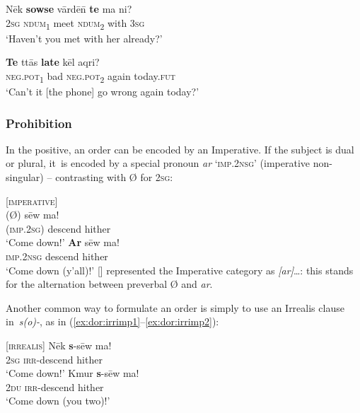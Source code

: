 \documentclass[output=paper,colorlinks,citecolor=brown,draft]{langscibook}
\begin{document}
\ea\label{ex:dor:mether} 
    \gll  Nēk \textbf{sowse} vārdē\={n} \textbf{te} ma ni?\\ 
          \textsc{2sg} \textsc{ndum\textsubscript{1}} meet \textsc{ndum\textsubscript{2}} with \textsc{3sg}\\
    \glt ‘Haven’t you met with her already?’ 
\z 


\ea\label{ex:dor:phone} 
    \gll   \textbf{Te} ttās \textbf{late} kēl aqri?\\ 
          \textsc{neg.pot\textsubscript{1}} bad \textsc{neg.pot\textsubscript{2}} again today.\textsc{fut}\\
    \glt  ‘Can’t it [the phone] go wrong again today?’   
\z 


\subsubsection{Prohibition}\label{sec:dor:2.2.2}

In the positive, an order can be encoded by an Imperative. If the subject is dual or plural, it~is encoded by a special pronoun  \textit{ar} ‘\textsc{imp.2nsg}' (imperative non-singular) – contrasting with  Ø for \textsc{2sg}:

\ea\label{ex:dor:imper} [\textsc{imperative}] \\
    \ea\label{ex:dor:imper1} 
        \gll (Ø) sēw ma! \\ 
             (\textsc{imp.2sg}) descend hither \\
        \glt ‘Come down!’ 
    \ex\label{ex:dor:imper2} 
        \gll \textbf{Ar} sēw ma!\\ 
             \textsc{imp.2nsg} descend hither\\
        \glt ‘Come down (y’all)!’ 
    \z 
\z 
{} [] represented the Imperative category as \textit{[ar]}…: this stands for the alternation between preverbal Ø and \textit{ar}.


Another common way to formulate an order is simply to use an Irrealis clause in~\textit{s(o)-}, as in (\ref{ex:dor:irrimp1}--\ref{ex:dor:irrimp2}):

\ea\label{ex:dor:irrimp} [\textsc{irrealis}] 
    \ea\label{ex:dor:irrimp1} 
        \gll Nēk \textbf{s}-sēw ma! \\ 
             \textsc{2sg} \textsc{irr-}descend hither \\
        \glt  ‘Come down!’ 
    \ex\label{ex:dor:irrimp2} 
        \gll Kmur \textbf{s}-sēw ma!\\ 
             \textsc{2du} \textsc{irr-}descend hither\\
        \glt ‘Come down (you two)!’ 
    \z 
\z 
\end{document}
